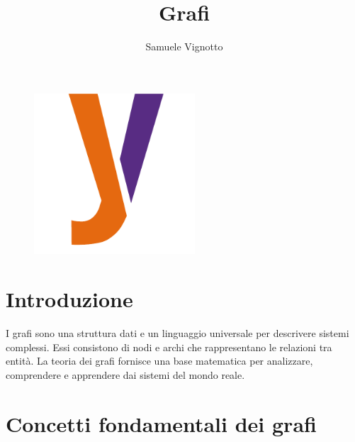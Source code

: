 \documentclass{article}
\title{\Huge{\textbf{Grafi}}\vspace{-1em}}
\author{Samuele Vignotto}
\date{}
\begin{document}
\maketitle
\begin{figure}[h]
  \centering
  \includegraphics[width=6cm, height=6cm]{Logo/Y_LOGO-SOLO.png}
  \label{fig:immagine}
\end{figure}

\newpage
\tableofcontents
\newpage

\section{Introduzione}
I grafi sono una struttura dati e un linguaggio universale per descrivere sistemi complessi. Essi consistono di nodi e archi che rappresentano le relazioni tra entità. La teoria dei grafi fornisce una base matematica per analizzare, comprendere e apprendere dai sistemi del mondo reale.

\section{Concetti fondamentali dei grafi}
\end{document}

